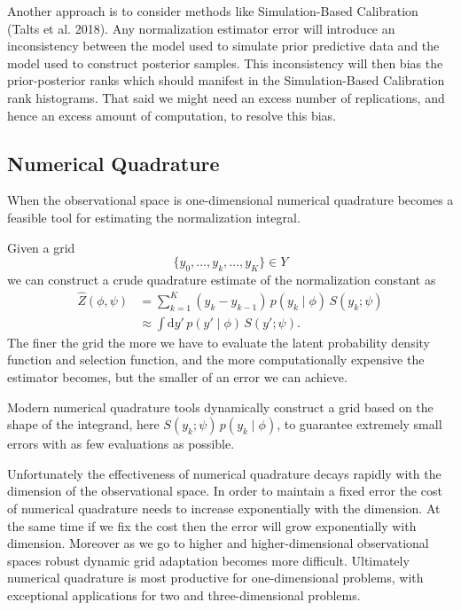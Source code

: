 \documentclass[
  letterpaper,
  DIV=11,
  numbers=noendperiod]{scrartcl}
\begin{document}
Another approach is to consider methods like Simulation-Based
Calibration (Talts et al. 2018). Any normalization estimator error will
introduce an inconsistency between the model used to simulate prior
predictive data and the model used to construct posterior samples. This
inconsistency will then bias the prior-posterior ranks which should
manifest in the Simulation-Based Calibration rank histograms. That said
we might need an excess number of replications, and hence an excess
amount of computation, to resolve this bias.

\subsection{Numerical Quadrature}\label{numerical-quadrature}

When the observational space is one-dimensional numerical quadrature
becomes a feasible tool for estimating the normalization integral.

Given a grid \[
\{ y_{0}, \ldots, y_{k}, \ldots, y_{K} \} \in Y
\] we can construct a crude quadrature estimate of the normalization
constant as \begin{align*}
\hat{Z}(\phi, \psi)
&=
\sum_{k = 1}^{K} (y_{k} - y_{k - 1}) \, p(y_{k} \mid \phi) \, S(y_{k}; \psi )
\\
&\approx
\int \mathrm{d}y' \, p(y' \mid \phi) \, S(y'; \psi ).
\end{align*} The finer the grid the more we have to evaluate the latent
probability density function and selection function, and the more
computationally expensive the estimator becomes, but the smaller of an
error we can achieve.

Modern numerical quadrature tools dynamically construct a grid based on
the shape of the integrand, here
\(S(y_{k}; \psi ) \, p(y_{k} \mid \phi)\), to guarantee extremely small
errors with as few evaluations as possible.

Unfortunately the effectiveness of numerical quadrature decays rapidly
with the dimension of the observational space. In order to maintain a
fixed error the cost of numerical quadrature needs to increase
exponentially with the dimension. At the same time if we fix the cost
then the error will grow exponentially with dimension. Moreover as we go
to higher and higher-dimensional observational spaces robust dynamic
grid adaptation becomes more difficult. Ultimately numerical quadrature
is most productive for one-dimensional problems, with exceptional
applications for two and three-dimensional problems.
\end{document}
